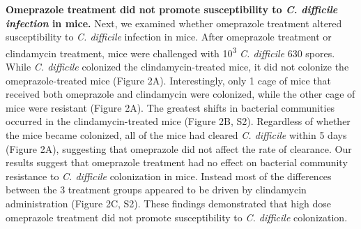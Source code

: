 \documentclass[11pt,]{article}
\begin{document}
\textbf{Omeprazole treatment did not promote susceptibility to \emph{C.
difficile infection} in mice.} Next, we examined whether omeprazole
treatment altered susceptibility to \emph{C. difficile} infection in
mice. After omeprazole treatment or clindamycin treatment, mice were
challenged with 10\textsuperscript{3} \emph{C. difficile} 630 spores.
While \emph{C. difficile} colonized the clindamycin-treated mice, it did
not colonize the omeprazole-treated mice (Figure 2A). Interestingly,
only 1 cage of mice that received both omeprazole and clindamycin were
colonized, while the other cage of mice were resistant (Figure 2A). The
greatest shifts in bacterial communities occurred in the
clindamycin-treated mice (Figure 2B, S2). Regardless of whether the mice
became colonized, all of the mice had cleared \emph{C. difficile} within
5 days (Figure 2A), suggesting that omeprazole did not affect the rate
of clearance. Our results suggest that omeprazole treatment had no
effect on bacterial community resistance to \emph{C. difficile}
colonization in mice. Instead most of the differences between the 3
treatment groups appeared to be driven by clindamycin administration
(Figure 2C, S2). These findings demonstrated that high dose omeprazole
treatment did not promote susceptibility to \emph{C. difficile}
colonization.
\end{document}

